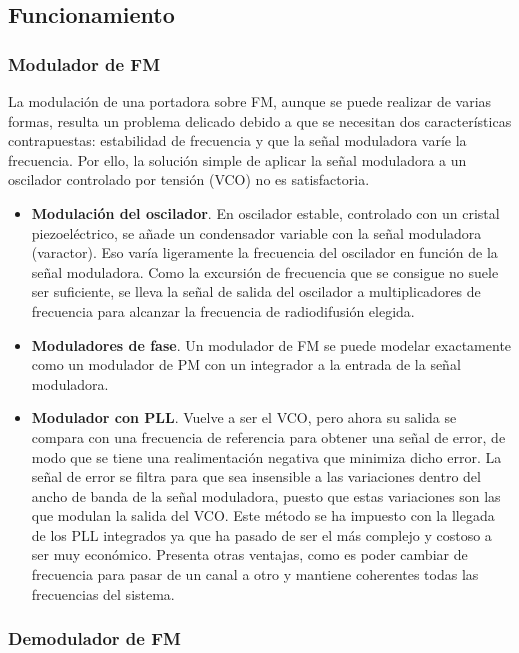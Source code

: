 \documentclass[a4paper]{article}
\begin{document}
\subsection{Funcionamiento}

\subsubsection{Modulador de FM}

La modulación de una portadora sobre FM, aunque se puede realizar de varias formas, resulta un problema delicado debido a que se necesitan dos características contrapuestas: estabilidad de frecuencia y que la señal moduladora varíe la frecuencia. Por ello, la solución simple de aplicar la señal moduladora a un oscilador controlado por tensión (VCO) no es satisfactoria.
\begin{itemize}
	\item \textbf{Modulación del oscilador}. En oscilador estable, controlado con un cristal piezoeléctrico, se añade un condensador variable con la señal moduladora (varactor). Eso varía ligeramente la frecuencia del oscilador en función de la señal moduladora. Como la excursión de frecuencia que se consigue no suele ser suficiente, se lleva la señal de salida del oscilador a multiplicadores de frecuencia para alcanzar la frecuencia de radiodifusión elegida.
	\item \textbf{Moduladores de fase}. Un modulador de FM se puede modelar exactamente como un modulador de PM con un integrador a la entrada de la señal moduladora.
	\item \textbf{Modulador con PLL}. Vuelve a ser el VCO, pero ahora su salida se compara con una frecuencia de referencia para obtener una señal de error, de modo que se tiene una realimentación negativa que minimiza dicho error. La señal de error se filtra para que sea insensible a las variaciones dentro del ancho de banda de la señal moduladora, puesto que estas variaciones son las que modulan la salida del VCO. Este método se ha impuesto con la llegada de los PLL integrados ya que ha pasado de ser el más complejo y costoso a ser muy económico. Presenta otras ventajas, como es poder cambiar de frecuencia para pasar de un canal a otro y mantiene coherentes todas las frecuencias del sistema.
\end{itemize}

\subsubsection{Demodulador de FM}
\end{document}
